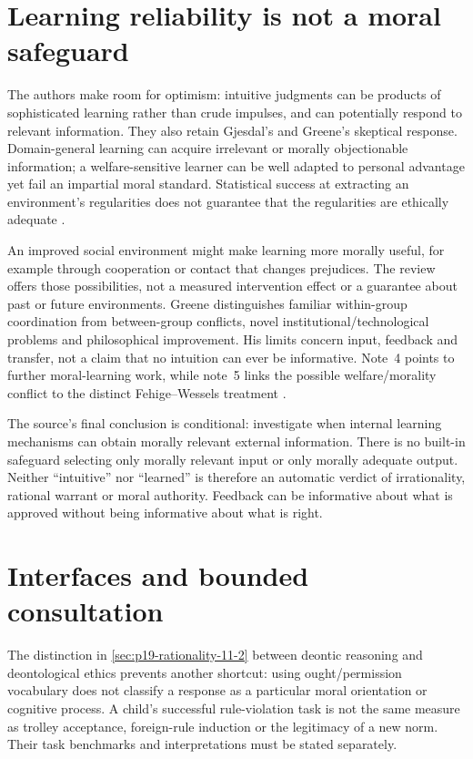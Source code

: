 \section{Learning reliability is not a moral safeguard}
\label{sec:p11-r123-normative}

The authors make room for optimism: intuitive judgments can be products
of sophisticated learning rather than crude impulses, and can potentially
respond to relevant information. They also retain Gjesdal's and Greene's
skeptical response. Domain-general learning can acquire irrelevant or
morally objectionable information; a welfare-sensitive learner can be
well adapted to personal advantage yet fail an impartial moral standard.
Statistical success at extracting an environment's regularities does not
guarantee that the regularities are ethically adequate
\parencite[pp.~706--707]{WiegmannSauer2021MoralJudgment}.

An improved social environment might make learning more morally useful,
for example through cooperation or contact that changes prejudices.
The review offers those possibilities, not a measured intervention effect
or a guarantee about past or future environments. Greene distinguishes
familiar within-group coordination from between-group conflicts, novel
institutional/technological problems and philosophical improvement. His
limits concern input, feedback and transfer, not a claim that no intuition
can ever be informative. Note~4 points to further moral-learning work,
while note~5 links the possible welfare/morality conflict to the distinct
Fehige--Wessels treatment
\parencite[pp.~706--707, notes~4--5]{WiegmannSauer2021MoralJudgment}.

The source's final conclusion is conditional: investigate when internal
learning mechanisms can obtain morally relevant external information.
There is no built-in safeguard selecting only morally relevant input or
only morally adequate output. Neither ``intuitive'' nor ``learned'' is
therefore an automatic verdict of irrationality, rational warrant or
moral authority. Feedback can be informative about what is approved
without being informative about what is right.

\section{Interfaces and bounded consultation}
\label{sec:p11-r123-use}

The distinction in \cref{sec:p19-rationality-11-2} between deontic
reasoning and deontological ethics prevents another shortcut: using
ought/permission vocabulary does not classify a response as a particular
moral orientation or cognitive process. A child's successful rule-violation
task is not the same measure as trolley acceptance, foreign-rule induction
or the legitimacy of a new norm. Their task benchmarks and interpretations
must be stated separately.

